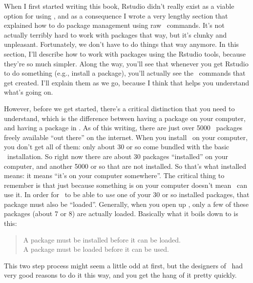 When I first started writing this book, Rstudio didn't really exist as a viable option for using \R, and as a consequence I wrote a very lengthy section that explained how to do package management using raw \R\ commands. It's not actually terribly hard to work with packages that way, but it's clunky and unpleasant. Fortunately, we don't have to do things that way anymore. In this section, I'll describe how to work with packages using the Rstudio tools, because they're so much simpler. Along the way, you'll see that whenever you get Rstudio to do something (e.g., install a package), you'll actually see the \R\ commands that get created. I'll explain them as we go, because I think that helps you understand what's going on. 

However, before we get started, there's a critical distinction that you need to understand, which is the difference between having a package  on your computer, and having a package  in \R. As of this writing, there are just over 5000 \R\ packages freely available ``out there'' on the internet. When you install \R\ on your computer, you don't get all of them: only about 30 or so come bundled with the basic \R\ installation. So right now there are about 30 packages ``installed'' on your computer, and another 5000 or so that are not installed. So that's what installed means: it means ``it's on your computer somewhere''. The critical thing to remember is that just because something is on your computer doesn't mean \R\ can use it. In order for \R\ to be able to {\it use} one of your 30 or so installed packages, that package must also be ``loaded''. Generally, when you open up \R, only a few of these packages (about 7 or 8) are actually loaded. Basically what it boils down to is this:
\begin{quote}
A package must be installed before it can be loaded.\\
A package must be loaded before it can be used.
\end{quote}
This two step process might seem a little odd at first, but the designers of \R\ had very good reasons to do it this way, and you get the hang of it pretty quickly.


